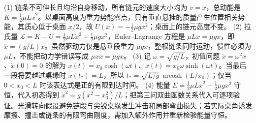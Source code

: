 (1) 链条不可伸长且均沿自身移动，所有链元的速度大小均为 \(v=\dot x\)，总动能是 \(K=\tfrac12\mu L\dot x^2\)。以桌面高度为重力势能零点，只有垂直悬挂的质量产生位置相关势能，其质心低于桌面 \(x/2\)，故 \(U(x)=-\tfrac12\mu gx^2\)；桌面上的链元高度不变。
(2) 拉氏量 \(\mathcal L=K-U=\tfrac12\mu L\dot x^2+\tfrac12\mu gx^2\)，Euler–Lagrange 方程是 \(\mu L\ddot x=\mu gx\)，即 \(\ddot x=(g/L)x\)。虽然驱动力仅是悬垂段重力 \(\mu gx\)，整根链条同时运动，惯性必须为 \(\mu L\)，不能把动力学错误写成 \(\mu x\ddot x=\mu gx\)。
(3) 记 \(\omega=\sqrt{g/L}\)，初值问题 \(\ddot x=\omega^2x\)、\(\dot x(0)=0\) 的解为 \(x(t)=x_0\cosh(\omega t)\)、\(\dot x(t)=x_0\omega\sinh(\omega t)\)。当最后一段将要越过桌缘时 \(x(t_*)=L\)，所以 \(t_*=\sqrt{L/g}\,\operatorname{arcosh}(L/x_0)\)；仅当 \(0<x_0<L\) 时该表达式是正的有限到达时间。
(4) 能量 \(E=\tfrac12\mu L\dot x^2-\tfrac12\mu gx^2\) 守恒，代入初态得到 \(\dot x^2=g(x^2-x_0^2)/L\)；把第三问双曲函数关系代入可逐项验证。光滑转向假设避免链段与尖锐桌缘发生冲击和局部弯曲损失；若实际桌角诱发摩擦、撞击或链条的有限弯曲刚度，需加入额外作用并重新检验能量守恒。
